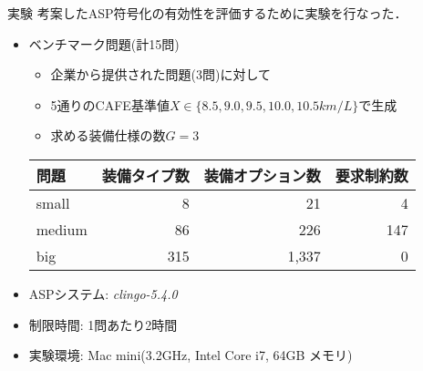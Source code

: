 \documentclass[dvipdfmx, 11pt]{beamer}
\begin{document}
\begin{frame}{実験}
 考案したASP符号化の有効性を評価するために実験を行なった．
 \begin{itemize}
  \item ベンチマーク問題(計15問)
	\begin{itemize}
	 \item 企業から提供された問題(3問)に対して
	 \item 5通りのCAFE基準値$X \in \{8.5, 9.0, 9.5, 10.0, 10.5km/L\}$で生成
	 \item 求める装備仕様の数$G = 3$
	\end{itemize}
	\begin{exampleblock}\small
	 \centering
	 \begin{tabular}{ l|r r r }
	  問題		& 装備タイプ数	& 装備オプション数& 要求制約数 	\\ \hline
	  small	        & 8     	& 21		& 4		\\
	  medium	& 86		& 226		& 147	\\
	  big		& 315		& 1,337		& 0		\\
	 \end{tabular}
	\end{exampleblock}
  \item ASPシステム: \textit{clingo-5.4.0}
  \item 制限時間: 1問あたり2時間
  \item 実験環境: Mac mini(3.2GHz, Intel Core i7, 64GB メモリ)
 \end{itemize}
\end{frame}
\end{document}
